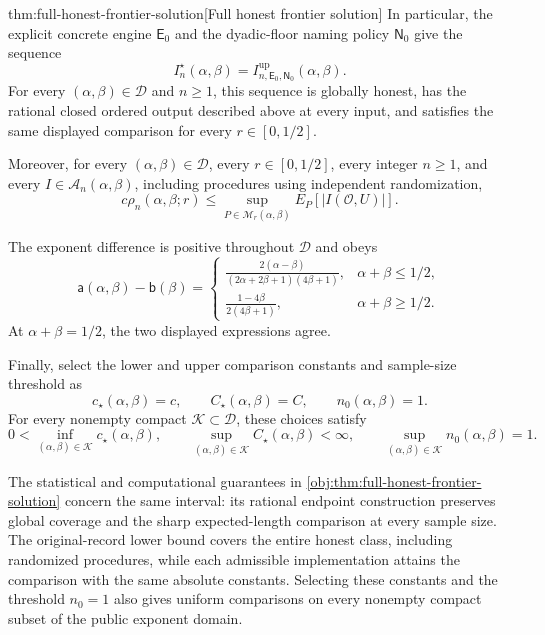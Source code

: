 \documentclass[11pt]{article}
\begin{document}
\begin{theoremv}{thm:full-honest-frontier-solution}[Full honest frontier solution]
In particular, the explicit concrete engine \(\mathsf E_0\) and the dyadic-floor naming policy \(\mathsf N_0\) give the sequence
\[
I_n^\star(\alpha,\beta)
=I^{\mathrm{up}}_{n,\mathsf E_0,\mathsf N_0}(\alpha,\beta).
\]
For every \((\alpha,\beta)\in\mathcal D\) and \(n\ge1\), this sequence is globally honest, has the rational closed ordered output described above at every input, and satisfies the same displayed comparison for every \(r\in[0,1/2]\).

Moreover, for every \((\alpha,\beta)\in\mathcal D\), every \(r\in[0,1/2]\), every integer \(n\ge1\), and every \(I\in\mathcal A_n(\alpha,\beta)\), including procedures using independent randomization,
\[
c\rho_n(\alpha,\beta;r)
\le
\sup_{P\in\mathcal M_r(\alpha,\beta)}
E_P\!\left[|I(\mathcal O,U)|\right].
\]

The exponent difference is positive throughout \(\mathcal D\) and obeys
\[
\mathsf a(\alpha,\beta)-\mathsf b(\beta)=
\begin{cases}
\displaystyle
\frac{2(\alpha-\beta)}
{(2\alpha+2\beta+1)(4\beta+1)},
&\alpha+\beta\le1/2,\\[6pt]
\displaystyle
\frac{1-4\beta}{2(4\beta+1)},
&\alpha+\beta\ge1/2.
\end{cases}
\]
At \(\alpha+\beta=1/2\), the two displayed expressions agree.

Finally, select the lower and upper comparison constants and sample-size threshold as
\[
c_\star(\alpha,\beta)=c,\qquad
C_\star(\alpha,\beta)=C,\qquad
n_0(\alpha,\beta)=1.
\]
For every nonempty compact \(\mathcal K\subset\mathcal D\), these choices satisfy
\[
0<
\inf_{(\alpha,\beta)\in\mathcal K}c_\star(\alpha,\beta),
\qquad
\sup_{(\alpha,\beta)\in\mathcal K}C_\star(\alpha,\beta)<\infty,
\qquad
\sup_{(\alpha,\beta)\in\mathcal K}n_0(\alpha,\beta)=1.
\]
\end{theoremv}

The statistical and computational guarantees in \cref{obj:thm:full-honest-frontier-solution} concern the same interval: its rational endpoint construction preserves global coverage and the sharp expected-length comparison at every sample size. The original-record lower bound covers the entire honest class, including randomized procedures, while each admissible implementation attains the comparison with the same absolute constants. Selecting these constants and the threshold \(n_0=1\) also gives uniform comparisons on every nonempty compact subset  of the public exponent domain.
\end{document}
